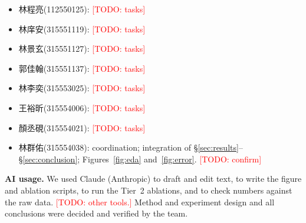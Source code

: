\documentclass[11pt]{article}
\newcommand{\todo}[1]{\textcolor{red}{[TODO: #1]}}
\begin{document}
\begin{itemize}
\setlength{\itemsep}{0em}
\setlength{\parsep}{0em}
\item \mbox{林程亮(112550125):} \todo{tasks}
\item \mbox{林庠安(315551119):} \todo{tasks}
\item \mbox{林景玄(315551127):} \todo{tasks}
\item \mbox{郭佳翰(315551137):} \todo{tasks}
\item \mbox{林李奕(315553025):} \todo{tasks}
\item \mbox{王裕昕(315554006):} \todo{tasks}
\item \mbox{顏丞硯(315554021):} \todo{tasks}
\item \mbox{林群佑(315554038):} coordination; integration of \S\ref{sec:results}--\S\ref{sec:conclusion}; Figures~\ref{fig:eda} and~\ref{fig:error}. \todo{confirm}
\end{itemize}

\textbf{AI usage.} We used Claude (Anthropic) to draft and edit text, to write the figure and ablation scripts, to run the Tier~2 ablations, and to check numbers against the raw data. \todo{other tools.} Method and experiment design and all conclusions were decided and verified by the team.

\clearpage

% 

\end{document}
